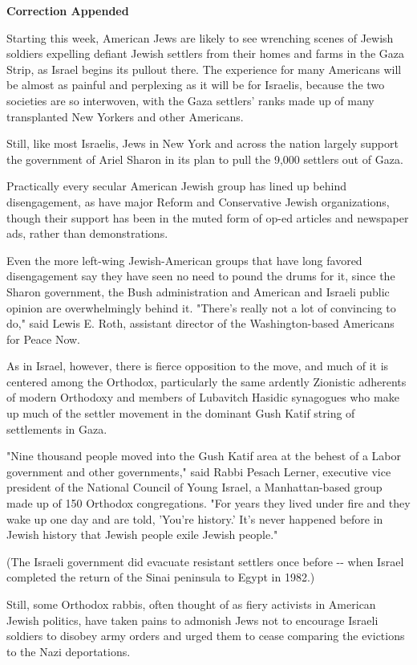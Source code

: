 \textbf{Correction Appended}

Starting this week, American Jews are likely to see wrenching scenes of
Jewish soldiers expelling defiant Jewish settlers from their homes and
farms in the Gaza Strip, as Israel begins its pullout there. The
experience for many Americans will be almost as painful and perplexing
as it will be for Israelis, because the two societies are so interwoven,
with the Gaza settlers' ranks made up of many transplanted New Yorkers
and other Americans.

Still, like most Israelis, Jews in New York and across the nation
largely support the government of Ariel Sharon in its plan to pull the
9,000 settlers out of Gaza.

Practically every secular American Jewish group has lined up behind
disengagement, as have major Reform and Conservative Jewish
organizations, though their support has been in the muted form of op-ed
articles and newspaper ads, rather than demonstrations.

Even the more left-wing Jewish-American groups that have long favored
disengagement say they have seen no need to pound the drums for it,
since the Sharon government, the Bush administration and American and
Israeli public opinion are overwhelmingly behind it. "There's really not
a lot of convincing to do," said Lewis E. Roth, assistant director of
the Washington-based Americans for Peace Now.

As in Israel, however, there is fierce opposition to the move, and much
of it is centered among the Orthodox, particularly the same ardently
Zionistic adherents of modern Orthodoxy and members of Lubavitch Hasidic
synagogues who make up much of the settler movement in the dominant Gush
Katif string of settlements in Gaza.

"Nine thousand people moved into the Gush Katif area at the behest of a
Labor government and other governments," said Rabbi Pesach Lerner,
executive vice president of the National Council of Young Israel, a
Manhattan-based group made up of 150 Orthodox congregations. "For years
they lived under fire and they wake up one day and are told, 'You're
history.' It's never happened before in Jewish history that Jewish
people exile Jewish people."

(The Israeli government did evacuate resistant settlers once before -\/-
when Israel completed the return of the Sinai peninsula to Egypt in
1982.)

Still, some Orthodox rabbis, often thought of as fiery activists in
American Jewish politics, have taken pains to admonish Jews not to
encourage Israeli soldiers to disobey army orders and urged them to
cease comparing the evictions to the Nazi deportations.


